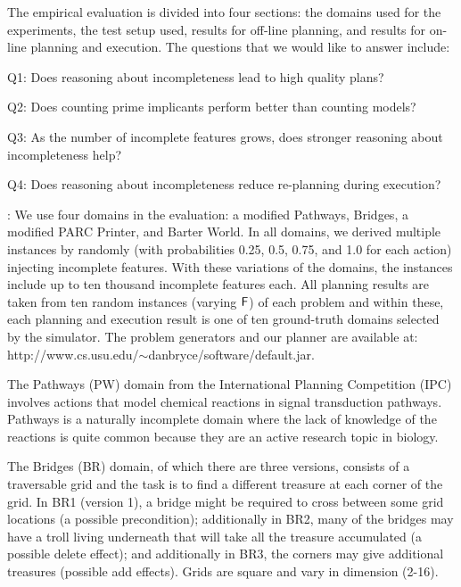 \documentclass[letterpaper]{article}
\newenvironment{packed_itemize}{
\begin{itemize}
  \setlength{\itemsep}{1pt}
  \setlength{\parskip}{0pt}
  \setlength{\parsep}{0pt}
}{\end{itemize}}
\def\und#1{\noindent{\bf #1}:}
\begin{document}
The empirical evaluation is divided into four sections:  the domains used for
the experiments, the test setup used, results for off-line planning, and results
for on-line planning and execution.  The questions that we would like to answer
include:
\begin{packed_itemize}
\item Q1: Does reasoning about incompleteness lead to high quality plans?
\item Q2: Does counting prime implicants perform better than counting models?
\item Q3: As the number of incomplete features grows, does stronger reasoning
about incompleteness help?
\item Q4: Does reasoning about incompleteness reduce re-planning during
execution?
\end{packed_itemize}





\und{Domains} We use four domains in the evaluation: a modified Pathways,
Bridges,  a modified PARC Printer, and Barter World.  In
all domains, we derived multiple instances by randomly (with probabilities 0.25,
0.5, 0.75, and 1.0 for each action) injecting incomplete  features.   
With these variations of the domains, the instances include up to ten thousand
incomplete  features each. All planning results are taken from ten random
instances (varying $\sf F$) of each problem and within these, each planning
and execution result is one of ten ground-truth domains selected by the
simulator. The problem generators and our planner are available at:
http://www.cs.usu.edu/$\sim$danbryce/software/default.jar.

The Pathways (PW) domain from the International Planning Competition  (IPC)
involves actions that model chemical reactions in signal transduction pathways. 
Pathways is a naturally incomplete domain where the lack of knowledge of the
reactions is quite common because they are an active research topic in biology.

The Bridges (BR) domain, of which there are three versions, consists of a
traversable grid and the task is to find a different treasure at each corner of
the grid. In BR1 (version 1), a bridge might be required  to cross between some
grid locations (a possible precondition); additionally in BR2, many of the
bridges may have a troll living underneath that will take all the treasure
accumulated (a possible delete effect); and additionally in BR3, the corners may
give additional treasures (possible add effects).  Grids are square and vary in
dimension (2-16).
\end{document}
